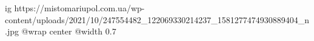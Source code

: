  
 
 
 
 

\ifcmt
  ig https://mistomariupol.com.ua/wp-content/uploads/2021/10/247554482_122069330214237_1581277474930889404_n.jpg
  @wrap center
  @width 0.7
\fi
